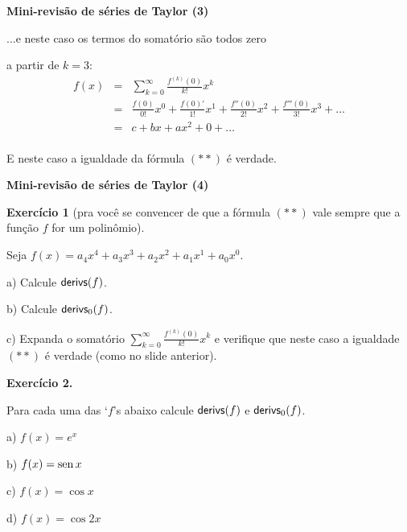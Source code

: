 \documentclass[oneside,12pt]{article}
\begin{document}
{\bf Mini-revisão de séries de Taylor (3)}

...e neste caso os termos do somatório são todos zero

a partir de $k=3$:
%
$$\begin{array}{rcl}
  f(x) &=& \displaystyle \sum_{k=0}^∞ \frac{f^{(k)}(0)}{k!} x^k \\[15pt]
       &=& \displaystyle
           \frac{f(0)}{0!} x^0 +
           \frac{f(0)'}{1!} x^1 +
           \frac{f''(0)}{2!} x^2 +
           \frac{f'''(0)}{3!} x^3 + \ldots \\[10pt]
       &=& c + bx + ax^2 + 0 + \ldots \\
  \end{array}
$$ 

E neste caso a igualdade da fórmula $(**)$ é verdade.

\newpage


{\bf Mini-revisão de séries de Taylor (4)}

\ssk


{\bf Exercício 1} (pra você se convencer de que a fórmula $(**)$ vale
sempre que a função $f$ for um polinômio).

Seja $f(x) = a_4x^4 + a_3x^3 + a_2x^2 + a_1x^1 + a_0x^0$.

\ssk

a) Calcule $\mathsf{derivs}(f)$.

b) Calcule $\mathsf{derivs}_0(f)$. 

c) Expanda o somatório $\sum_{k=0}^∞ \frac{f^{(k)}(0)}{k!} x^k$ e
verifique que neste caso a igualdade $(**)$ é verdade (como no slide
anterior).

\msk


{\bf Exercício 2.}

Para cada uma das `$f$'s abaixo calcule $\mathsf{derivs}(f)$ e $\mathsf{derivs}_0(f)$.

a) $f(x) = e^x$

b) $f(x) = \operatorname{sen} x$

c) $f(x) = \cos x$

d) $f(x) = \cos 2x$
\end{document}
